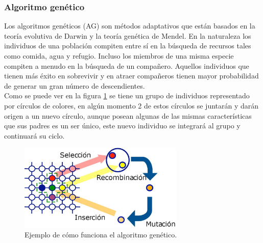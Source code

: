 

\subsubsection {Algoritmo genético}

Los algoritmos genéticos (AG) son métodos adaptativos que están basados en la teoría evolutiva de Darwin y la teoría genética de Mendel. En la naturaleza los individuos de una población compiten entre sí en la búsqueda de recursos tales como comida, agua y refugio. Incluso los miembros de una misma especie compiten a menudo en la búsqueda de un compañero. Aquellos individuos que tienen más éxito en sobrevivir y en atraer compañeros tienen mayor probabilidad de generar un gran número de descendientes.\\
\hspace*{1cm}Como se puede ver en la figura \ref{fig:agenetico} se tiene un grupo de individuos representado por círculos de colores, en algún momento 2 de estos círculos se juntarán y darán origen a un nuevo círculo, aunque posean algunas de las mismas características que sus padres es un ser único, este nuevo individuo se integrará al grupo y continuará su ciclo.

    \begin{figure}[hbtp]
        \centering
            \includegraphics[width=0.7\textwidth]{MarcoTeorico/Imagenes/agenetico.png}
            \caption{Ejemplo de cómo funciona el algoritmo genético.}                       
            \label{fig:agenetico}
    \end{figure} 
    
